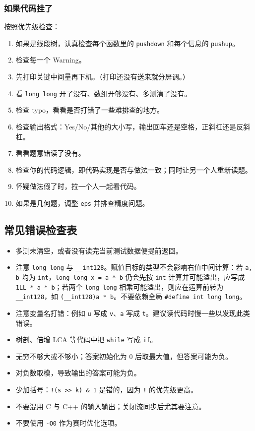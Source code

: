 \subsubsection{如果代码挂了}
按照优先级检查：
\begin{enumerate}[leftmargin=5mm]
  \setlength{\itemsep}{0pt}
  \item 如果是线段树，认真检查每个函数里的 \texttt{pushdown} 和每个信息的 \texttt{pushup}。
  \item 检查每一个 Warning。
  \item 先打印关键中间量再下机。（打印还没有送来就分屏调。）
  \item 看 \texttt{long long} 开了没有、数组开够没有、多测清了没有。
  \item 检查 typo，看看是否打错了一些难排查的地方。
  \item 检查输出格式：Yes/No/其他的大小写，输出回车还是空格，正斜杠还是反斜杠。
  \item 看看题意错读了没有。
  \item 检查你的代码逻辑，即代码实现是否与做法一致；同时让另一个人重新读题。
  \item 怀疑做法假了时，拉一个人一起看代码。
  \item 如果是几何题，调整 \texttt{eps} 并排查精度问题。
\end{enumerate}

\subsection{常见错误检查表}
\begin{itemize}[leftmargin=5mm]
  \setlength{\itemsep}{0pt}
  \item 多测未清空，或者没有读完当前测试数据便提前返回。
  \item 注意 \texttt{long long} 与 \texttt{\_\_int128}。赋值目标的类型不会影响右值中间计算：若 \texttt{a, b} 均为 \texttt{int}，\texttt{long long x = a * b} 仍会先按 \texttt{int} 计算并可能溢出，应写成 \texttt{1LL * a * b}；若两个 \texttt{long long} 相乘可能溢出，则应在运算前转为 \texttt{\_\_int128}，如 \texttt{(\_\_int128)a * b}。不要依赖全局 \texttt{\#define int long long}。
  \item 注意变量名打错：例如 \texttt{u} 写成 \texttt{v}、\texttt{a} 写成 \texttt{t}。建议读代码时慢一些以发现此类错误。
  \item 树剖、倍增 LCA 等代码中把 \texttt{while} 写成 \texttt{if}。
  \item 无穷不够大或不够小；答案初始化为 0 后取最大值，但答案可能为负。
  \item 对负数取模，导致输出的答案可能为负。
  \item 少加括号：\texttt{!(s >> k) \& 1} 是错的，因为 \texttt{!} 的优先级更高。
  \item 不要混用 C 与 C++ 的输入输出；关闭流同步后尤其要注意。
  \item 不要使用 \texttt{-O0} 作为赛时优化选项。
\end{itemize}

